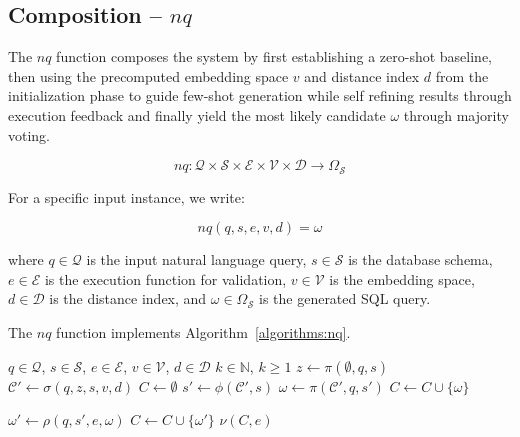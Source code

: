 \subsection{Composition – $nq$}

The $nq$ function composes the system by first establishing a
zero-shot baseline, then using the precomputed embedding space $v$ and distance
index $d$ from the initialization phase to guide few-shot generation while
self refining results through execution feedback and finally yield the most likely
candidate $\omega$ through majority voting.

$$
nq: \mathcal{Q} \times \mathcal{S} \times \mathcal{E} \times \mathcal{V} \times \mathcal{D} \rightarrow \Omega_{\mathcal{S}}
$$

\vspace{0.5em}

For a specific input instance, we write:

$$
nq(q, s, e, v, d) = \omega
$$

\vspace{0.5em}

where $q \in \mathcal{Q}$ is the input natural language query, $s \in \mathcal{S}$
is the database schema, $e \in \mathcal{E}$ is the execution function for validation,
$v \in \mathcal{V}$ is the embedding space, $d \in \mathcal{D}$ is the distance index,
and $\omega \in \Omega_{\mathcal{S}}$ is the generated SQL query.

The $nq$ function implements Algorithm~\ref{algorithms:nq}.

\begin{algorithm}
\caption{$nq$}\label{algorithms:nq}
\begin{algorithmic}[1]
\Require $q \in \mathcal{Q}$, $s \in \mathcal{S}$, $e \in \mathcal{E}$, $v \in \mathcal{V}$, $d \in \mathcal{D}$
\Require $k \in \mathbb{N}$, $k \geq 1$             
\State $z \gets \pi(\emptyset, q, s)$               
\State $\mathcal{C}' \gets \sigma(q, z, s, v, d)$   
\State $C \gets \emptyset$                          
                                   
    \State $s' \gets \phi(\mathcal{C}', s)$         
    \State $\omega \gets \pi(\mathcal{C}', q, s')$  
                                
        \State $C \gets C \cup \{\omega\}$          
    \EndIf

    \State $\omega' \gets \rho(q, s', e, \omega)$   
                               
        \State $C \gets C \cup \{\omega'\}$         
    \EndIf
\EndWhile
\State \Return $\nu(C, e)$                          
\end{algorithmic}
\end{algorithm}
